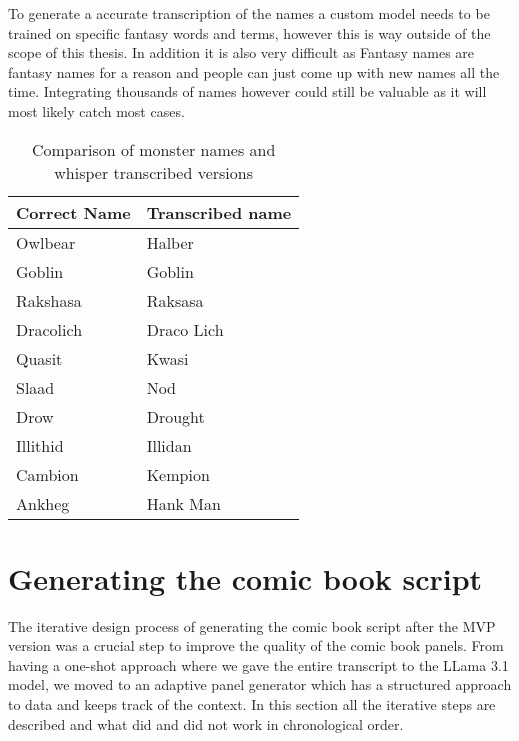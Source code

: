 To generate a accurate transcription of the names a custom model needs to be trained on specific fantasy words and terms, however this is way outside of the scope of this thesis. In addition it is also very difficult as Fantasy names are fantasy names for a reason and people can just come up with new names all the time. Integrating thousands of names however could still be valuable as it will most likely catch most cases.
\begin{table}[h!]
\centering
\begin{tabular}{|l|l|}
\hline
\textbf{Correct Name} & \textbf{Transcribed name} \\
\hline
Owlbear    & Halber     \\
Goblin     & Goblin     \\
Rakshasa   & Raksasa    \\
Dracolich  & Draco Lich \\
Quasit     & Kwasi      \\
Slaad      & Nod        \\
Drow       & Drought    \\
Illithid   & Illidan    \\
Cambion    & Kempion    \\
Ankheg     & Hank Man   \\
\hline
\end{tabular}
\caption{Comparison of monster names and whisper transcribed versions}
\label{tab:monster_names}
\end{table}

\section{Generating the comic book script}
The iterative design process of generating the comic book script after the MVP version was a crucial step to improve the quality of the comic book panels. From having a one-shot approach where we gave the entire transcript to the LLama 3.1 model, we moved to an adaptive panel generator which has a structured approach to data and keeps track of the context. In this section all the iterative steps are described and what did and did not work in chronological order.

